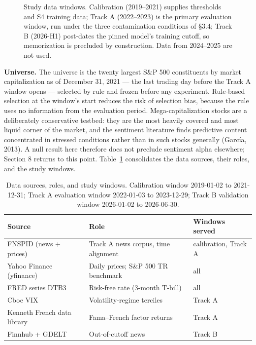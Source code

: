 \documentclass[
  12pt,
]{article}
\begin{document}
\begin{figure}[htbp]
\centering
\resizebox{\linewidth}{!}{}
\caption{Study data windows. Calibration (2019--2021) supplies thresholds and S4 training data; Track A (2022--2023) is the primary evaluation window, run under the three contamination conditions of §3.4; Track B (2026-H1) post-dates the pinned model's training cutoff, so memorization is precluded by construction. Data from 2024--2025 are not used.}
\label{fig:windows}
\end{figure}



\textbf{Universe.} The universe is the twenty largest S\&P 500
constituents by market capitalization as of December 31, 2021 --- the
last trading day before the Track A window opens --- selected by rule
and frozen before any experiment. Rule-based selection at the window's
start reduces the risk of selection bias, because the rule uses no
information from the evaluation period. Mega-capitalization stocks are a
deliberately conservative testbed: they are the most heavily covered and
most liquid corner of the market, and the sentiment literature finds
predictive content concentrated in stressed conditions rather than in
such stocks generally (García, 2013). A null result here therefore does
not preclude sentiment alpha elsewhere; Section 8 returns to this point. Table~\ref{tab:sources} consolidates the data sources, their roles, and the study windows.

\begin{table}[H]
\centering\small
\caption{Data sources, roles, and study windows. Calibration window
2019-01-02 to 2021-12-31; Track A evaluation window 2022-01-03 to 2023-12-29;
Track B validation window 2026-01-02 to 2026-06-30.}
\label{tab:sources}
\begin{tabular}{lll}
\toprule
Source & Role & Windows served \\
\midrule
FNSPID (news + prices) & Track A news corpus, time alignment & calibration, Track A \\
Yahoo Finance (yfinance) & Daily prices; S\&P 500 TR benchmark & all \\
FRED series DTB3 & Risk-free rate (3-month T-bill) & all \\
Cboe VIX & Volatility-regime terciles & Track A \\
Kenneth French data library & Fama–French factor returns & Track A \\
Finnhub + GDELT & Out-of-cutoff news & Track B \\
\bottomrule
\end{tabular}
\end{table}
\end{document}
